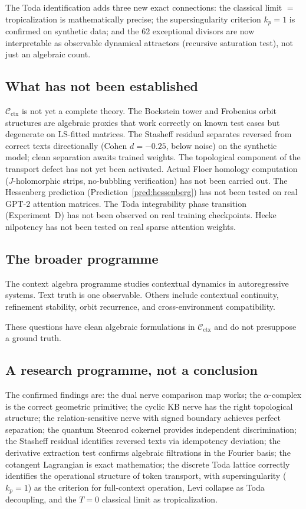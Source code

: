\documentclass[11pt]{amsart}
\theoremstyle{definition}
\newcommand{\Cctx}{\mathcal{C}_{\!\mathrm{ctx}}}
\begin{document}
The Toda identification adds three new exact connections:
the classical limit $= $ tropicalization is mathematically precise;
the supersingularity criterion $k_p = 1$ is confirmed on synthetic data;
and the 62 exceptional divisors are now interpretable as observable
dynamical attractors (recursive saturation test), not just an algebraic count.

\subsection{What has not been established}

$\Cctx$ is not yet a complete theory.
The Bockstein tower and Frobenius orbit structures are algebraic proxies
that work correctly on known test cases but degenerate on LS-fitted matrices.
The Stasheff residual separates reversed from correct texts directionally
(Cohen $d = -0.25$, below noise) on the synthetic model;
clean separation awaits trained weights.
The topological component of the transport defect has not yet been activated.
Actual Floer homology computation ($J$-holomorphic strips, no-bubbling verification)
has not been carried out.
The Hessenberg prediction (Prediction~\ref{pred:hessenberg}) has not been
tested on real GPT-2 attention matrices.
The Toda integrability phase transition (Experiment~D) has not been
observed on real training checkpoints.
Hecke nilpotency has not been tested on real sparse attention weights.

\subsection{The broader programme}

The context algebra programme studies contextual dynamics in autoregressive systems.
Text truth is one observable.
Others include contextual continuity, refinement stability, orbit recurrence,
and cross-environment compatibility.

These questions have clean algebraic formulations in $\Cctx$
and do not presuppose a ground truth.

\subsection{A research programme, not a conclusion}

The confirmed findings are:
the dual nerve comparison map works;
the $\alpha$-complex is the correct geometric primitive;
the cyclic KB nerve has the right topological structure;
the relation-sensitive nerve with signed boundary achieves perfect separation;
the quantum Steenrod cokernel provides independent discrimination;
the Stasheff residual identifies reversed texts via idempotency deviation;
the derivative extraction test confirms algebraic filtrations in the Fourier basis;
the cotangent Lagrangian is exact mathematics;
the discrete Toda lattice correctly identifies the operational structure of
token transport, with supersingularity ($k_p=1$) as the criterion for
full-context operation, Levi collapse as Toda decoupling, and the
$T=0$ classical limit as tropicalization.
\end{document}

